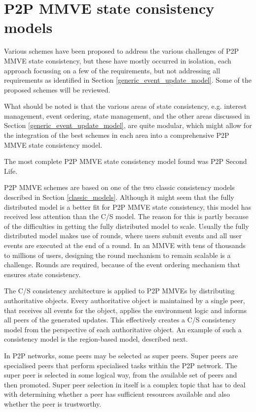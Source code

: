 \section{P2P MMVE state consistency models}
\label{p2p_mmve_state_consistency}

Various schemes have been proposed to address the various challenges of P2P MMVE state consistency, but these have mostly occurred in isolation, each approach focussing on a few of the requirements, but not addressing all requirements as identified in Section \ref{generic_event_update_model}. Some of the proposed schemes will be reviewed.

What should be noted is that the various areas of state consistency, e.g. interest management, event ordering, state management, and the other areas discussed in Section \ref{generic_event_update_model}, are quite modular, which might allow for the integration of the best schemes in each area into a comprehensive P2P MMVE state consistency model.

The most complete P2P MMVE state consistency model found was P2P Second Life.

P2P MMVE schemes are based on one of the two classic consistency models described in Section \ref{classic_models}. Although it might seem that the fully distributed model is a better fit for P2P MMVE state consistency, this model has received less attention than the C/S model. The reason for this is partly because of the difficulties in getting the fully distributed model to scale. Usually the fully distributed model makes use of rounds, where users submit events and all user events are executed at the end of a round. In an MMVE with tens of thousands to millions of users, designing the round mechanism to remain scalable is a challenge. Rounds are required, because of the event ordering mechanism that ensures state consistency.

The C/S consistency architecture is applied to P2P MMVEs by distributing authoritative objects. Every authoritative object is maintained by a single peer, that receives all events for the object, applies the environment logic and informs all peers of the generated updates. This effectively creates a C/S consistency model from the perspective of each authoritative object. An example of such a consistency model is the region-based model, described next.

In P2P networks, some peers may be selected as super peers. Super peers are specialised peers that perform specialised tasks within the P2P network. The super peer is selected in some logical way, from the available set of peers and then promoted. Super peer selection in itself is a complex topic that has to deal with determining whether a peer has sufficient resources available and also whether the peer is trustworthy.

